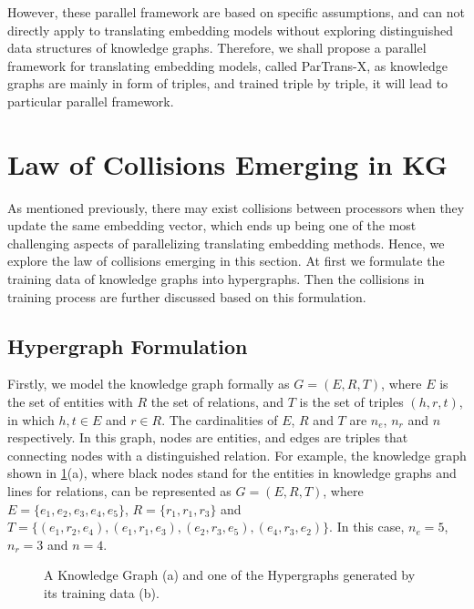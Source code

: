 \documentclass[sigconf]{acmart}
\begin{document}
However, these parallel framework are based on specific assumptions, and can not directly apply to translating embedding models without exploring distinguished data structures of knowledge graphs. 
Therefore, we shall propose  a parallel framework for translating embedding models, called ParTrans-X, as knowledge graphs are mainly in form of triples, and trained triple by triple, it will lead to particular parallel framework.



\section{Law of Collisions Emerging in KG}
As mentioned previously, there may exist collisions between processors  when they update the same embedding vector, which ends up being one of the most challenging aspects of parallelizing translating embedding methods. Hence, we explore the law of collisions emerging in this section.
At first we formulate the training data of knowledge graphs into hypergraphs. Then  the collisions in training process are further discussed based on this formulation.


\subsection{Hypergraph Formulation}


Firstly, we model the knowledge graph formally as $G=(E,R,T)$, where $E$ is the set of entities with $R$ the set of relations, and $T$ is the set of triples $(h, r, t)$, in which $h,t \in E$ and $r \in R$. The  cardinalities of $E$, $R$ and $T$ are $n_e$, $n_r$ and $n$ respectively. In this graph, nodes are entities, and edges are triples that connecting nodes with a distinguished relation.
For example, the knowledge graph shown in \figurename \ref{hypergraph}(a), where black nodes stand for the entities in knowledge graphs and lines for relations, can be represented as $G=(E,R,T)$, where $E=\{e_1,e_2,e_3,e_4,e_5\}$, $R=\{r_1, r_1, r_3\}$ and $T=\{(e_1,r_2,e_4),(e_1,r_1,e_3),(e_2,r_3,e_5),(e_4,r_3,e_2)\}$. In this case, $n_e=5$, $n_r=3$ and $n=4$.

\begin{figure}[!h]
\centering
{}
\vspace{-7pt}
\caption{A Knowledge Graph (a) and one of the Hypergraphs generated by its training data (b). }
\label{hypergraph}
\vspace{-7pt}
\end{figure}
\end{document}

